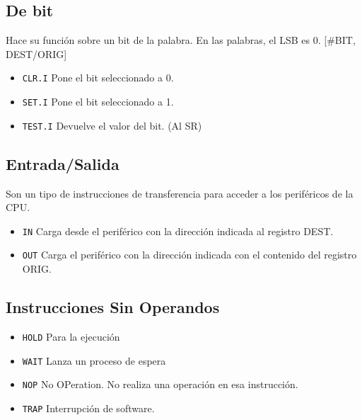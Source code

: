 \documentclass[a4paper,11pt,spanish]{report}
\begin{document}
\subsection{De bit}
Hace su función sobre un bit de la palabra. En las palabras, el LSB es 0. [\#BIT, DEST/ORIG]
\begin{itemize}
\item \verb|CLR.I| \textrightarrow Pone el bit seleccionado a 0.
\item \verb|SET.I| \textrightarrow Pone el bit seleccionado a 1.
\item \verb|TEST.I| \textrightarrow Devuelve el valor del bit. (Al SR)
\end{itemize}
\subsection{Entrada/Salida}
Son un tipo de instrucciones de transferencia para acceder a los periféricos de la CPU.
\begin{itemize}
\item \verb|IN|  Carga desde el periférico con la dirección indicada al registro DEST.
\item \verb|OUT|  Carga el periférico con la dirección indicada con el contenido del registro ORIG.
\end{itemize}
\subsection{Instrucciones Sin Operandos}
\begin{itemize}
\item \verb|HOLD| \textrightarrow Para la ejecución
\item \verb|WAIT| \textrightarrow Lanza un proceso de espera
\item \verb|NOP| \textrightarrow No OPeration. No realiza una operación en esa instrucción.
\item \verb|TRAP| \textrightarrow Interrupción de software.
\end{itemize}
\end{document}
